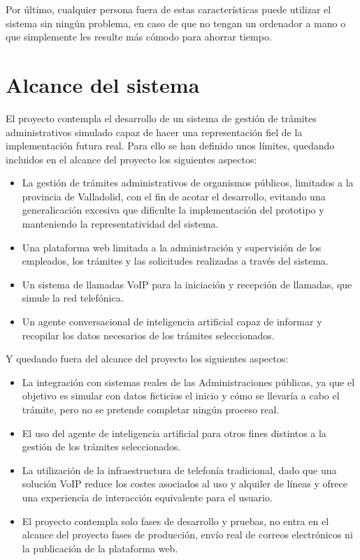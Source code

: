 \documentclass[12pt, a4paper, twoside]{report}
\begin{document}
        Por último, cualquier persona fuera de estas características puede utilizar el sistema sin ningún problema, en caso de que no tengan un ordenador a mano o que simplemente les resulte más cómodo para ahorrar tiempo.
        
    \section{Alcance del sistema}
        El proyecto contempla el desarrollo de un sistema de gestión de trámites administrativos simulado capaz de hacer una representación fiel de la implementación futura real. 
        Para ello se han definido unos límites, quedando incluidos en el alcance del proyecto los siguientes aspectos:
        \begin{itemize}
            \item La gestión de trámites administrativos de organismos públicos, limitados a la provincia de Valladolid, con el fin de acotar el desarrollo, evitando una generalicación excesiva que dificulte la implementación del prototipo y manteniendo la representatividad del sistema.
            \item Una plataforma web limitada a la administración y supervisión de los empleados, los trámites y las solicitudes realizadas a través del sistema.
            \item Un sistema de llamadas VoIP para la iniciación y recepción de llamadas, que simule la red telefónica.
            \item Un agente conversacional de inteligencia artificial capaz de informar y recopilar los datos necesarios de los trámites seleccionados.
        \end{itemize}
        Y quedando fuera del alcance del proyecto los siguientes aspectos:
        \begin{itemize}
            \item La integración con sistemas reales de las Administraciones públicas, ya que el objetivo es simular con datos ficticios el inicio y cómo se llevaría a cabo el trámite, pero no se pretende completar ningún proceso real.
            \item El uso del agente de inteligencia artificial para otros fines distintos a la gestión de los trámites seleccionados.
            \item La utilización de la infraestructura de telefonía tradicional, dado que una solución VoIP reduce los costes asociados al uso y alquiler de líneas y ofrece una experiencia de interacción equivalente para el usuario.
            \item El proyecto contempla solo fases de desarrollo y pruebas, no entra en el alcance del proyecto fases de producción, envío real de correos electrónicos ni la publicación de la plataforma web.
        \end{itemize}
        
\end{document}
